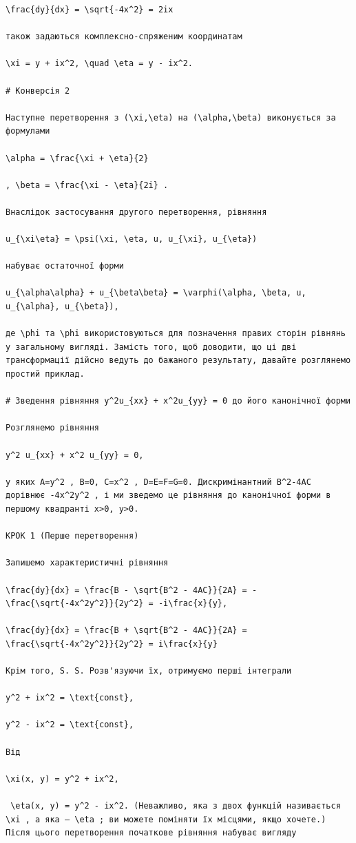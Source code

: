 \documentclass[
  ukrainian,
]{article}
\begin{document}
\begin{verbatim}
\frac{dy}{dx} = \sqrt{-4x^2} = 2ix

також задаються комплексно-спряженим координатам

\xi = y + ix^2, \quad \eta = y - ix^2.

# Конверсія 2

Наступне перетворення з (\xi,\eta) на (\alpha,\beta) виконується за формулами

\alpha = \frac{\xi + \eta}{2}

, \beta = \frac{\xi - \eta}{2i} .

Внаслідок застосування другого перетворення, рівняння

u_{\xi\eta} = \psi(\xi, \eta, u, u_{\xi}, u_{\eta})

набуває остаточної форми

u_{\alpha\alpha} + u_{\beta\beta} = \varphi(\alpha, \beta, u, u_{\alpha}, u_{\beta}),

де \phi та \phi використовуються для позначення правих сторін рівнянь у загальному вигляді. Замість того, щоб доводити, що ці дві трансформації дійсно ведуть до бажаного результату, давайте розглянемо простий приклад.

# Зведення рівняння y^2u_{xx} + x^2u_{yy} = 0 до його канонічної форми

Розглянемо рівняння

y^2 u_{xx} + x^2 u_{yy} = 0,

у яких A=y^2 , B=0, C=x^2 , D=E=F=G=0. Дискримінантний B^2-4AC дорівнює -4x^2y^2 , і ми зведемо це рівняння до канонічної форми в першому квадранті x>0, y>0.

КРОК 1 (Перше перетворення)

Запишемо характеристичні рівняння

\frac{dy}{dx} = \frac{B - \sqrt{B^2 - 4AC}}{2A} = -\frac{\sqrt{-4x^2y^2}}{2y^2} = -i\frac{x}{y},

\frac{dy}{dx} = \frac{B + \sqrt{B^2 - 4AC}}{2A} = \frac{\sqrt{-4x^2y^2}}{2y^2} = i\frac{x}{y}

Крім того, S. S. Розв'язуючи їх, отримуємо перші інтеграли

y^2 + ix^2 = \text{const},

y^2 - ix^2 = \text{const},

Від

\xi(x, y) = y^2 + ix^2,

 \eta(x, y) = y^2 - ix^2. (Неважливо, яка з двох функцій називається \xi , а яка — \eta ; ви можете поміняти їх місцями, якщо хочете.) Після цього перетворення початкове рівняння набуває вигляду


\end{verbatim}
\end{document}
